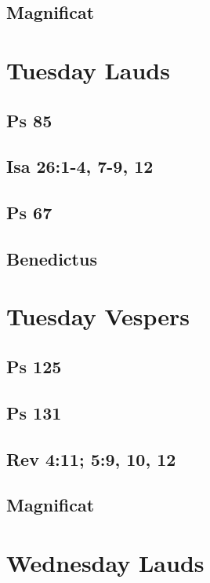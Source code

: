 \subsection{Magnificat}


\section{Tuesday Lauds}

\subsection{Ps 85}

\subsection{Isa 26:1-4, 7-9, 12}

\subsection{Ps 67}

\subsection{Benedictus}


\section{Tuesday Vespers}

\subsection{Ps 125}

\subsection{Ps 131}

\subsection{Rev 4:11; 5:9, 10, 12}

\subsection{Magnificat}


\section{Wednesday Lauds}

